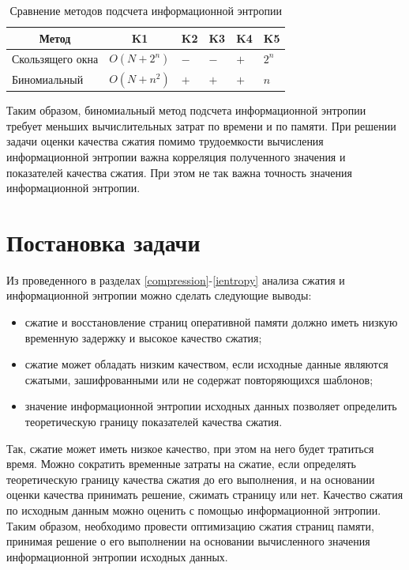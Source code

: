 \begin{table}[h]
    \caption{Сравнение методов подсчета информационной энтропии}
    \begin{center}
        \begin{tabular}{|l|l|l|l|l|l|}
        		\hline
            \multicolumn{1}{|c}{\textbf{Метод}} & 
            \multicolumn{1}{|c|}{\textbf{K1}} &
            \multicolumn{1}{c|}{\textbf{K2}} &
            \multicolumn{1}{c|}{\textbf{K3}} &
            \multicolumn{1}{c|}{\textbf{K4}} &
            \multicolumn{1}{c|}{\textbf{K5}} \\ \hline
            Скользящего окна & $O(N + 2^n)$ & $-$ & $-$ & $+$ & $2^n$ \\ \hline
            Биномиальный & $O(N + n^2)$ & $+$ & $+$ & $+$ & $n$ \\ \hline
        \end{tabular}
    \end{center}
    \label{tab:comparison}
\end{table}

Таким образом, биномиальный метод подсчета информационной энтропии требует меньших вычислительных затрат по времени и по памяти. При решении задачи оценки качества сжатия помимо трудоемкости вычисления информационной энтропии важна корреляция полученного значения и показателей качества сжатия. При этом не так важна точность значения информационной энтропии.

\section{Постановка задачи}

Из проведенного в разделах \ref{compression}-\ref{ientropy} анализа сжатия и информационной энтропии можно сделать следующие выводы:

\begin{itemize}
	\item сжатие и восстановление страниц оперативной памяти должно иметь низкую временную задержку и высокое качество сжатия;
    \item сжатие может обладать низким качеством, если исходные данные являются сжатыми, зашифрованными или не содержат повторяющихся шаблонов;
	\item значение информационной энтропии исходных данных позволяет определить теоретическую границу показателей качества сжатия.
\end{itemize}

Так, сжатие может иметь низкое качество, при этом на него будет тратиться время. Можно сократить временные затраты на сжатие, если определять теоретическую границу качества сжатия до его выполнения, и на основании оценки качества принимать решение, сжимать страницу или нет. Качество сжатия по исходным данным можно оценить с помощью информационной энтропии. Таким образом, необходимо провести оптимизацию сжатия страниц памяти, принимая решение о его выполнении на основании вычисленного значения информационной энтропии исходных данных.

